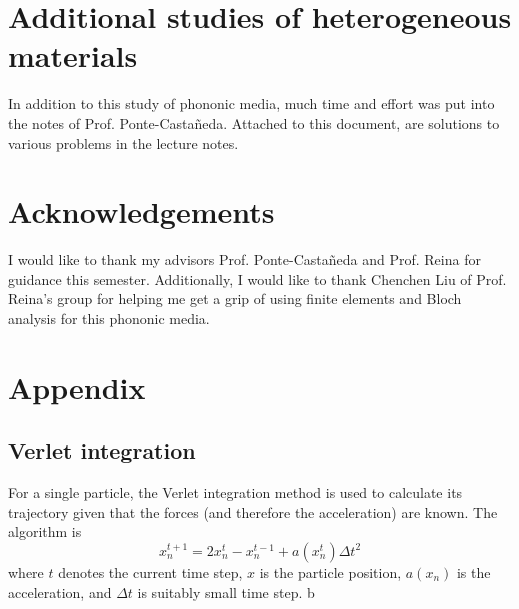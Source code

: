 \documentclass{article}
\begin{document}
\section{Additional studies of heterogeneous materials}
In addition to this study of phononic media, much time and effort was put into 
the notes of Prof. Ponte-Casta\~neda. Attached to this document, are solutions 
to various problems in the lecture notes. 

\section{Acknowledgements}
I would like to thank my advisors Prof. Ponte-Casta\~neda and Prof. Reina for
guidance this semester. Additionally, I would like to thank Chenchen Liu of
Prof. Reina's group for helping me get a grip of using finite elements and Bloch
analysis for this phononic media.

\appendix
\section{Appendix}
\subsection{Verlet integration} \label{verlet}
For a single particle, the Verlet integration method is used to calculate its 
trajectory given that the forces (and therefore the acceleration) are known. 
The algorithm is
\begin{equation}
x^{t+1}_{n} = 2x^{t}_{n} - x^{t-1}_{n} + a(x^{t}_n)\Delta t^2
\end{equation}
where $t$ denotes the current time step, $x$ is the particle position, $a(x_n)$ 
is the acceleration, and $\Delta t$ is suitably small time step. b
\end{document}

